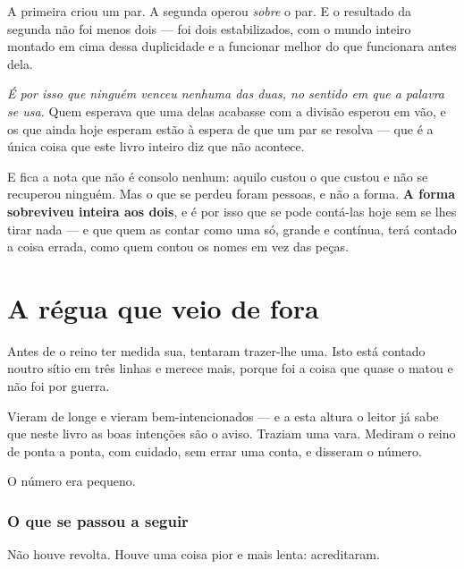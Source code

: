 \documentclass[livro.tex]{subfiles}
\begin{document}
\medskip

A primeira criou um par. A segunda operou \emph{sobre} o par. E o resultado da segunda não foi
menos dois --- foi dois estabilizados, com o mundo inteiro montado em cima dessa duplicidade e a
funcionar melhor do que funcionara antes dela.

\medskip

\emph{É por isso que ninguém venceu nenhuma das duas, no sentido em que a palavra se usa.} Quem
esperava que uma delas acabasse com a divisão esperou em vão, e os que ainda hoje esperam estão à
espera de que um par se resolva --- que é a única coisa que este livro inteiro diz que não
acontece.

\medskip

E fica a nota que não é consolo nenhum: aquilo custou o que custou e não se recuperou ninguém. Mas
o que se perdeu foram pessoas, e não a forma. \textbf{A forma sobreviveu inteira aos dois}, e é
por isso que se pode contá-las hoje sem se lhes tirar nada --- e que quem as contar como uma só,
grande e contínua, terá contado a coisa errada, como quem contou os nomes em vez das peças.


\chapter{A régua que veio de fora}

Antes de o reino ter medida sua, tentaram trazer-lhe uma. Isto está contado noutro sítio em três
linhas e merece mais, porque foi a coisa que quase o matou e não foi por guerra.

\medskip

Vieram de longe e vieram bem-intencionados --- e a esta altura o leitor já sabe que neste livro as
boas intenções são o aviso. Traziam uma vara. Mediram o reino de ponta a ponta, com cuidado, sem
errar uma conta, e disseram o número.

\medskip

O número era pequeno.

\subsection*{O que se passou a seguir}

Não houve revolta. Houve uma coisa pior e mais lenta: acreditaram.
\end{document}
